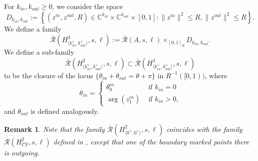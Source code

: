 \documentclass{article}
\newtheorem{rem}[lem]{Remark}
\def\cY{\mathcal{Y}}
\def\cC{\mathcal{C}}
\def\Rbar{\overline{\mathcal{R}}}
\def\C{\mathbb{C}}
\begin{document}
For $k_{in},k_{out} \ge 0$, we consider the space 
$$D_{k_{in},k_{out}} := \left\{ (z^{in},z^{out},R) \in \C^{k_{in}} \times \C^{k_{out}} \times [0,1]: \|z^{in}\|^2 \le R, \|z^{out}\|^2 \le R \right\}.$$
We define a family 
$$\Rbar(H^3_{\langle k^\vee_{in},k^\vee_{out}\rangle},s,\ell):= \Rbar(A,s,\ell) \times_{[0,1]_R} D_{k_{in},k_{out}}.$$
We define a sub-family 
$$\Rbar(H^2_{\langle k^\vee_{in},k^\vee_{out}\rangle},s,\ell) \subset \Rbar(H^3_{\langle k^\vee_{in},k^\vee_{out}\rangle},s,\ell)$$
to be the closure of the locus $\{\theta_{in} + \theta_{out} = \theta + \pi\}$ in $R^{-1}([0,1))$, where
$$\theta_{in} = \begin{cases}
                    \theta_0^{in} & \text{ if $k_{in} = 0$}\\
                    \arg(z^{in}_1) & \text{ if $k_{in} > 0$,}
\end{cases}     $$
and $\theta_{out}$ is defined analogously. 

\begin{rem}
    Note that the family $\Rbar(H^2_{\langle 0^\vee,0^\vee\rangle},s,\ell)$ coincides with the family $\Rbar(H^2_{\cC\cY},s,\ell)$ defined in \cite[Section 5.6]{relfukii}, except that one of the boundary marked points there is outgoing.
\end{rem}
\end{document}
